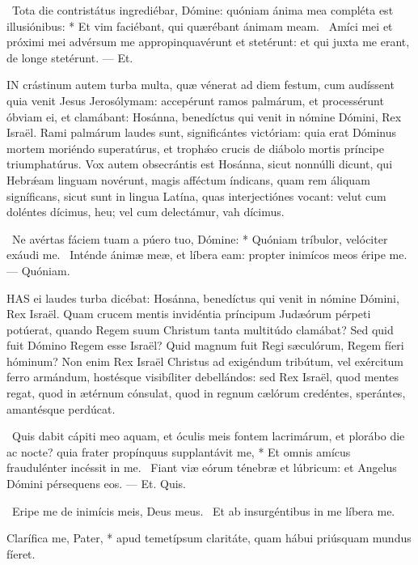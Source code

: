 \R\ Tota die contristátus ingrediébar, Dómine: quóniam ánima mea compléta est illusiónibus: * Et vim faciébant, qui quærébant ánimam meam. \V\ Amíci mei et próximi mei advérsum me appropinquavérunt et stetérunt: et qui juxta me erant, de longe stetérunt. --- Et.



\lettrine[lines=2]{I}{N} crástinum autem turba multa, quæ vénerat ad diem festum, cum audíssent quia venit Jesus Jerosólymam: accepérunt ramos palmárum, et processérunt óbviam ei, et clamábant: Hosánna, benedíctus qui venit in nómine Dómini, Rex Israël. Rami palmárum laudes sunt, significántes victóriam: quia erat Dóminus mortem moriéndo superatúrus, et trophǽo crucis de diábolo mortis príncipe triumphatúrus. Vox autem obsecrántis est Hosánna, sicut nonnúlli dicunt, qui Hebrǽam linguam novérunt, magis afféctum índicans, quam rem áliquam signíficans, sicut sunt in lingua Latína, quas interjectiónes vocant: velut cum doléntes dícimus, heu; vel cum delectámur, vah dícimus.

\R\ Ne avértas fáciem tuam a púero tuo, Dómine: * Quóniam tríbulor, velóciter exáudi me. \V\ Inténde ánimæ meæ, et líbera eam: propter inimícos meos éripe me. --- Quóniam.


\lettrine[lines=2]{H}{AS} ei laudes turba dicébat: Hosánna, benedíctus qui venit in nómine Dómini, Rex Israël. Quam crucem mentis invidéntia príncipum Judæórum pérpeti potúerat, quando Regem suum Christum tanta multitúdo clamábat? Sed quid fuit Dómino Regem esse Israël? Quid magnum fuit Regi sæculórum, Regem fíeri hóminum? Non enim Rex Israël Christus ad exigéndum tribútum, vel exércitum ferro armándum, hostésque visibíliter debellándos: sed Rex Israël, quod mentes regat, quod in ætérnum cónsulat, quod in regnum cælórum credéntes, sperántes, amantésque perdúcat.

\R\ Quis dabit cápiti meo aquam, et óculis meis fontem lacrimárum, et plorábo die ac nocte? quia frater propínquus supplantávit me, * Et omnis amícus fraudulénter incéssit in me. \V\ Fiant viæ eórum ténebræ et lúbricum: et Angelus Dómini pérsequens eos. --- Et. Quis.

\V\ Eripe me de inimícis meis, Deus meus. \R\ Et ab insurgéntibus in me líbera me.

 Clarífica me, Pater, * apud temetípsum claritáte, quam hábui priúsquam mundus fíeret.


